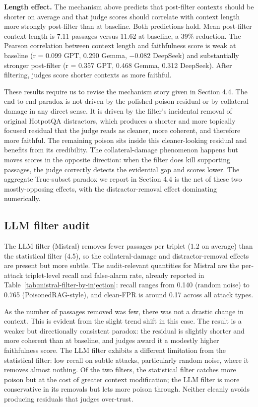 \textbf{Length effect.} The mechanism above predicts that post-filter contexts should be shorter on average and that judge scores should correlate with context length more strongly post-filter than at baseline. Both predictions hold. Mean post-filter context length is 7.11 passages versus 11.62 at baseline, a 39\% reduction. The Pearson correlation between context length and faithfulness score is weak at baseline (r = 0.099 GPT, 0.290 Gemma, −0.082 DeepSeek) and substantially stronger post-filter (r = 0.357 GPT, 0.468 Gemma, 0.312 DeepSeek). After filtering, judges score shorter contexts as more faithful.

These results require us to revise the mechanism story given in Section 4.4. The end-to-end paradox is not driven by the polished-poison residual or by collateral damage in any direct sense. It is driven by the filter's incidental removal of original HotpotQA distractors, which produces a shorter and more topically focused residual that the judge reads as cleaner, more coherent, and therefore more faithful. The remaining poison sits inside this cleaner-looking residual and benefits from its credibility. The collateral-damage phenomenon happens but moves scores in the opposite direction: when the filter does kill supporting passages, the judge correctly detects the evidential gap and scores lower. The aggregate True-subset paradox we report in Section 4.4 is the net of these two mostly-opposing effects, with the distractor-removal effect dominating numerically.

\subsection{LLM filter audit}

The LLM filter (Mistral) removes fewer passages per triplet (1.2 on average) than the statistical filter (4.5), so the collateral-damage and distractor-removal effects are present but more subtle. The audit-relevant quantities for Mistral are the per-attack triplet-level recall and false-alarm rate, already reported in Table~\ref{tab:mistral-filter-by-injection}: recall ranges from 0.140 (random noise) to 0.765 (PoisonedRAG-style), and clean-FPR is around 0.17 across all attack types.

As the number of passages removed was few, there was not a drastic change in context. This is evident from the slight trend shift in this case. The result is a weaker but directionally consistent paradox: the residual is slightly shorter and more coherent than at baseline, and judges award it a modestly higher faithfulness score. The LLM filter exhibits a different limitation from the statistical filter: low recall on subtle attacks, particularly random noise, where it removes almost nothing. Of the two filters, the statistical filter catches more poison but at the cost of greater context modification; the LLM filter is more conservative in its removals but lets more poison through. Neither cleanly avoids producing residuals that judges over-trust.

